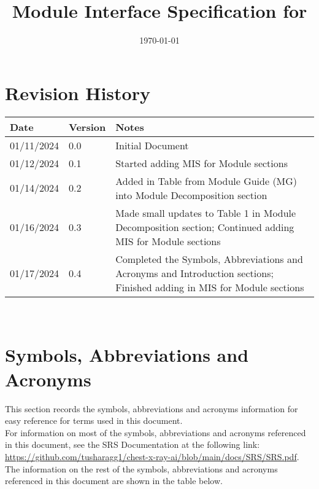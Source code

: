 \documentclass[12pt, titlepage]{article}
\begin{document}
\title{Module Interface Specification for \progname{}}

\author{\authname}

\date{\today}

\maketitle


\section{Revision History}

\begin{tabularx}{\textwidth}{p{3cm}p{2cm}X}
\toprule {\bf Date} & {\bf Version} & {\bf Notes}\\
\midrule
01/11/2024 & 0.0 & Initial Document \\
01/12/2024 & 0.1 & Started adding MIS for Module sections \\
01/14/2024 & 0.2 & Added in Table from Module Guide (MG) into Module
  Decomposition section \\
01/16/2024 & 0.3 & Made small updates to Table 1 in Module Decomposition
  section; Continued adding MIS for Module sections \\
01/17/2024 & 0.4 & Completed the Symbols, Abbreviations and Acronyms and
  Introduction sections; Finished adding in MIS for Module sections \\
\bottomrule
\end{tabularx}

~\newpage

\section{Symbols, Abbreviations and Acronyms}

This section records the symbols, abbreviations and acronyms information for
easy reference for terms used in this document. \\

For information on most of the symbols, abbreviations and acronyms referenced
in this document, see the SRS Documentation at the following link:
\url{https://github.com/tusharagg1/chest-x-ray-ai/blob/main/docs/SRS/SRS.pdf}. \\

The information on the rest of the symbols, abbreviations and acronyms
referenced in this document are shown in the table below. \\
\end{document}
